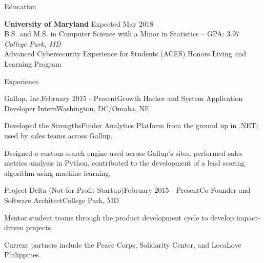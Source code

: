 \documentclass{resume} %
\begin{document}

\begin{rSection}{Education}

{\bf University of Maryland} \hfill {Expected May 2018} \\ 
{B.S. and M.S. in Computer Science with a Minor in Statistics -- GPA: 3.97} \hfill {\em College Park, MD} \\
Advanced Cybersecurity Experience for Students (ACES) Honors Living and Learning Program

\end{rSection}


\begin{rSection}{Experience}

\begin{rSubsection}{Gallup, Inc.}{February 2015 - Present}{Growth Hacker and System Application Developer Intern}{Washington, DC/Omaha, NE}
\item Developed the StrengthsFinder Analytics Platform from the ground up in .NET; used by sales teams across Gallup.
\item Designed a custom search engine used across Gallup's sites, performed sales metrics analysis in Python, contributed to the development of a lead scoring algorithm using machine learning.
\end{rSubsection}

\begin{rSubsection}{Project Delta (Not-for-Profit Startup)}{February 2015 - Present}{Co-Founder and Software Architect}{College Park, MD}
\item Mentor student teams through the product development cycle to develop impact-driven projects.
\item Current partners include the Peace Corps, Solidarity Center, and LocaLove Philippines.
\end{rSubsection}



\end{rSection}
\end{document}
